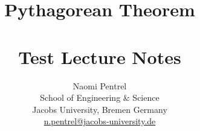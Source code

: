 \begin{frontmatter}
\begin{blindomgroup}
\title{Pythagorean Theorem\\
\the\year\\ Test Lecture Notes}
\author{Naomi Pentrel\\[1ex]
    School of Engineering \& Science\\
    Jacobs University,  Bremen Germany\\
    \url{n.pentrel@jacobs-university.de}}

\maketitle\newpage
\clearpage\setcounter{tocdepth}{4}\tableofcontents\clearpage
\end{blindomgroup}
\end{frontmatter}

